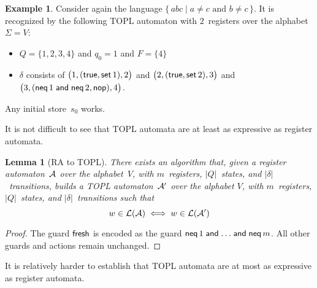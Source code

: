 \documentclass[9pt, preprint]{sigplanconf} %
\newtheorem{lemma}{Lemma}
\theoremstyle{definition}
\newtheorem{example}{Example}
\theoremstyle{remark}
\begin{document}
\begin{example}\label{ex:topl1}
Consider again the language $\{\,abc\mid\text{$a\ne c$ and $b\ne c$}\,\}$.
It is recognized by the following TOPL automaton with $2$~registers over the alphabet $\Sigma=V$:
\begin{itemize}
\item $Q=\{1,2,3,4\}$ and $q_0=1$ and $F=\{4\}$
\item $\delta$ consists of
  $\bigl(1,({\sf true}, {\sf set}\,1),2\bigr)$
  and $\bigl(2,({\sf true}, {\sf set}\,2),3\bigr)$
  and $\bigl(3,({\sf neq}\,1\mathrel{\sf and}{\sf neq}\,2, {\sf nop}),4\bigr)$.
\end{itemize}
Any initial store~$s_0$ works.
\end{example}

It is not difficult to see that TOPL automata are at least as expressive as register automata.

\begin{lemma}[RA to TOPL]\label{lemma:ra-to-topl}
There exists an algorithm that, given a register automaton~${\cal A}$ over the alphabet~$V$, with $m$~registers, $|Q|$~states, and $|\delta|$~transitions, builds a TOPL automaton~${\cal A}'$ over the alphabet $V$, with $m$~registers, $|Q|$~states, and $|\delta|$~transitions such that
\[w\in{\cal L}({\cal A}) \iff w\in{\cal L}({\cal A}') \]
\end{lemma}
\begin{proof}
The guard ${\sf fresh}$ is encoded as the guard ${\sf neq}\,1 \mathrel{\sf and} \ldots \mathrel{\sf and}{\sf neq}\,m$.
All other guards and actions remain unchanged.
\end{proof}

It is relatively harder to establish that TOPL automata are at most as expressive as register automata.
\end{document}
